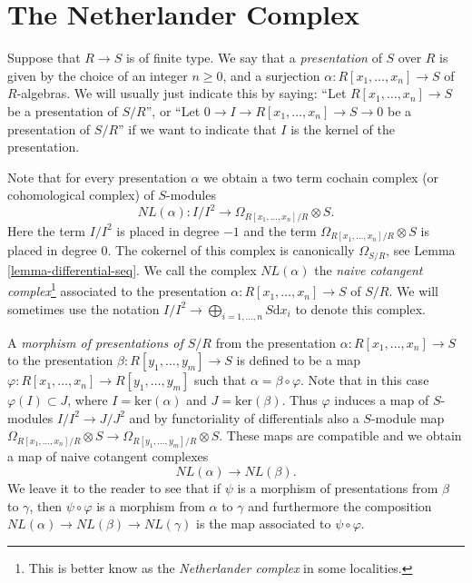 \section{The Netherlander Complex}
\label{section-netherlander}

\noindent
Suppose that $R \to S$ is of finite type.
We say that a {\it presentation} of $S$ over $R$ is
given by the choice of an integer $n \geq 0$, and
a surjection $\alpha : R[x_1,\ldots,x_n] \to S$
of $R$-algebras. We will usually just indicate
this by saying: ``Let $R[x_1,\ldots,x_n] \to S$ be a presentation of
$S/R$'', or ``Let $0\to I \to R[x_1,\ldots,x_n] \to S \to 0$
be a presentation of $S/R$'' if we want to indicate that $I$
is the kernel of the presentation.

\medskip\noindent
Note that for every presentation $\alpha$ we obtain a two term
cochain complex (or cohomological complex) of $S$-modules
$$
NL(\alpha) :
I/I^2 \longrightarrow \Omega_{R[x_1,\ldots,x_n]/R}\otimes S.
$$
Here the term $I/I^2$ is placed in degree $-1$ and
the term $\Omega_{R[x_1,\ldots,x_n]/R}\otimes S$ is
placed in degree $0$.
The cokernel of this complex is canonically $\Omega_{S/R}$,
see Lemma \ref{lemma-differential-seq}. We call the complex
$NL(\alpha)$
the {\it naive cotangent complex}\footnote{This is better know as the {\it 
Netherlander complex} in some localities.} associated to the
presentation $\alpha : R[x_1,\ldots,x_n] \to S$ of $S/R$. We will
sometimes use the notation
$I/I^2 \to \bigoplus_{i=1,\ldots,n} S\text{d}x_i$
to denote this complex.

\medskip\noindent
A {\it morphism of presentations of $S/R$} from the presentation
$\alpha : R[x_1,\ldots,x_n] \to S$ to the presentation
$\beta : R[y_1,\ldots,y_m] \to S$ is defined to be a
map $\varphi : R[x_1,\ldots,x_n] \to R[y_1,\ldots,y_m]$
such that $\alpha = \beta \circ \varphi$. Note that
in this case $\varphi(I) \subset J$, where $I = \text{ker}(\alpha)$
and $J = \text{ker}(\beta)$. Thus $\varphi$ induces a map
of $S$-modules $I/I^2 \to J/J^2$ and by functoriality of
differentials also a $S$-module map
$\Omega_{R[x_1,\ldots,x_n]/R}\otimes S
\to \Omega_{R[y_1,\ldots,y_m]/R}\otimes S$.
These maps are compatible and we obtain a map
of naive cotangent complexes
$$
NL(\alpha) \longrightarrow NL(\beta).
$$
We leave it to the reader to see that if $\psi$ is a morphism
of presentations from $\beta$ to $\gamma$, then $\psi \circ \varphi$
is a morphism from $\alpha$ to $\gamma$ and furthermore 
the composition $NL(\alpha) \to NL(\beta) \to NL(\gamma)$
is the map associated to $\psi \circ \varphi$.

